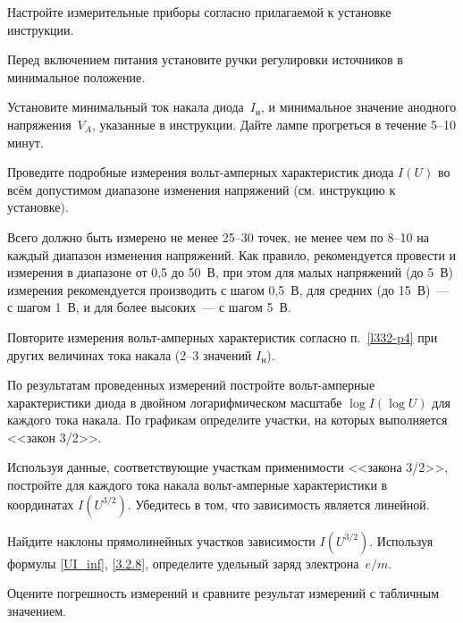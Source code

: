 \begin{lab:task}



    
\item Настройте измерительные приборы согласно прилагаемой к установке
инструкции.

\item Перед включением питания установите ручки регулировки источников
в минимальное положение.

\item Установите минимальный ток накала диода~$I_\text{н}$, 
и минимальное значение анодного напряжения~$V_{A}$, 
указанные в инструкции. Дайте лампе прогреться в течение 5--10 минут.

\item\label{l332-p4} Проведите подробные измерения вольт-амперных характеристик диода 
$I(U)$ во всём допустимом диапазоне изменения напряжений  (см. инструкцию
к установке). 

Всего должно быть измерено не менее 25--30 точек, 
не менее чем по 8--10 на каждый диапазон изменения напряжений. 
Как правило, рекомендуется провести и измерения в диапазоне от 0,5 до 50~В, 
при этом для малых напряжений (до 5~В) измерения рекомендуется производить 
с шагом 0,5~В, для средних (до 15~В)~--- с шагом 1~В, и 
для более высоких~--- с шагом 5~В.

\item Повторите измерения вольт-амперных характеристик согласно п.~\ref{l332-p4}
при других величинах тока накала (2--3 значений $I_{н}$).


\item По результатам проведенных измерений постройте 
вольт-амперные характеристики диода 
в двойном логарифмическом масштабе
$\log I (\log U)$
для каждого тока накала. По графикам определите участки, на которых
выполняется <<закон 3/2>>.

\item Используя данные, соответствующие участкам применимости
<<закона 3/2>>, постройте для каждого тока накала вольт-амперные 
характеристики в координатах $I(U^{3/2})$. 
Убедитесь в том, что зависимость является линейной. 

\item Найдите наклоны прямолинейных участков зависимости
$I(U^{3/2})$. Используя формулы \eqref{UI_inf}, \eqref{3.2.8}, 
определите удельный заряд электрона~$e/m$.

\item Оцените погрешность измерений и 
сравните результат измерений с табличным значением.

\end{lab:task}


